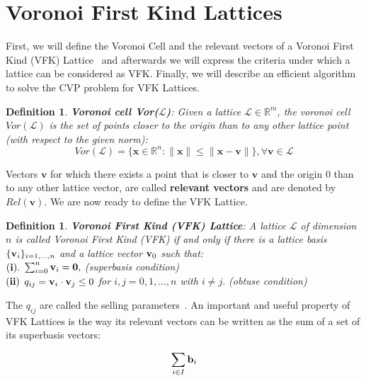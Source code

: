 \documentclass{amsart}
\newtheorem{definition}[theorem]{Definition}
\numberwithin{equation}{section}
\def\L{\mathcal{L}}
\begin{document}
\section{Voronoi First Kind Lattices}\label{sec:VFK}

First, we will define the Voronoi Cell and the relevant vectors of a Voronoi First Kind (VFK) Lattice~\cite{} and afterwards we will express the criteria under which a lattice can be considered as VFK. Finally, we will describe an efficient algorithm~\cite{VFK-CVP} to solve the CVP problem for VFK Lattices.

\begin{definition}
\textbf{Voronoi cell Vor($\L$)}: Given a lattice $\L \in \mathbb{R}^m$, the voronoi cell $Vor(\L)$ is the set of points closer to the origin than to any other lattice point (with respect to the given norm):
$$ Vor(\L) = \{ \textbf{x} \in \mathbb{R}^n : \|\textbf{x}\| \leq \| \textbf{x}-\textbf{v} \|\}, \forall \textbf{v} \in \L $$
\end{definition}

Vectors $\textbf{v}$ for which there exists a point that is closer to $ \textbf{v}$ and the origin $0$ than to any other lattice vector, are called \textbf{relevant vectors} and are denoted by $Rel(\textbf{v})$. We are now ready to define the VFK Lattice.

\begin{definition}
\textbf{Voronoi First Kind (VFK) Lattice}: A lattice $\L$ of dimension $n$ is called Voronoi First Kind (VFK) if and only if there is a lattice basis $\{{\bf v}_i\}_{i=1,...,n}$ and a lattice vector ${\bf v}_{0}$ such that:\\

$({\bf i}).$ $\sum_{i=0}^{n}{\bf v}_i ={\bf 0}, $ (superbasis condition)\\

$({\bf ii})$ $q_{ij} = {\bf v}_i\cdot {\bf v}_j \leq 0$ for $i,j=0,1,...,n$ with $i\not =j.$ (obtuse condition)
\end{definition}

The $q_{ij}$ are called the selling parameters~\cite{SELLING}. An important and useful property of VFK Lattices is the way its relevant vectors can be written as the sum of a set of its superbasis vectors:

\begin{equation}
\sum_{i\in I}{\bf b}_i
\label{equation:VFK_REL}
\end{equation}
\end{document}
